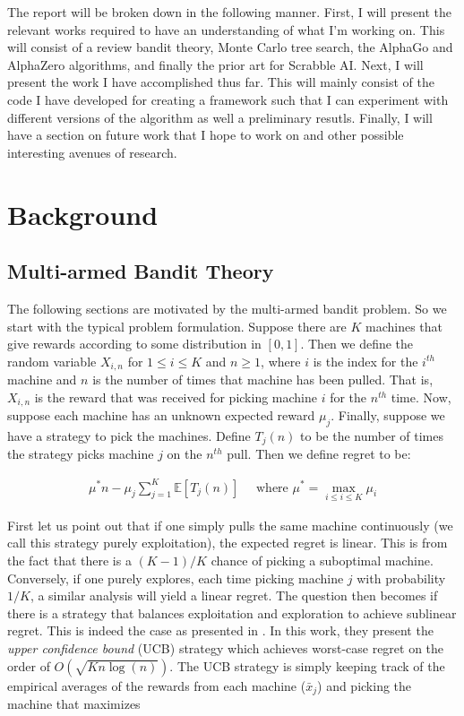 \documentclass{article}
\begin{document}
  The report will be broken down in the following manner. First, I will present the relevant works required to have an understanding of what I'm working on. This will consist of a review bandit theory, Monte Carlo tree search, the AlphaGo and AlphaZero algorithms, and finally the prior art for Scrabble AI. Next, I will present the work I have accomplished thus far. This will mainly consist of the code I have developed for creating a framework such that I can experiment with different versions of the algorithm as well a preliminary resutls. Finally, I will have a section on future work that I hope to work on and other possible interesting avenues of research.

  \clearpage

  \section{Background}

  \subsection{Multi-armed Bandit Theory}
  The following sections are motivated by the multi-armed bandit problem. So we start with the typical problem formulation. Suppose there are $K$ machines that give rewards according to some distribution in $[0,1]$. Then we define the random variable $X_{i,n}$ for $1 \leq i \leq K$ and $n \geq 1$, where $i$ is the index for the $i^{th}$ machine and $n$ is the number of times that machine has been pulled. That is, $X_{i,n}$ is the reward that was received for picking machine $i$ for the $n^{th}$ time. Now, suppose each machine has an unknown expected reward $\mu_j$. Finally, suppose we have a strategy to pick the machines. Define $T_j(n)$ to be the number of times the strategy picks machine $j$ on the $n^{th}$ pull. Then we define regret to be:

  \begin{gather*}
    \mu^*n - \mu_j \sum_{j=1}^K \mathbb{E} [T_j(n)] \quad \text{ where } \mu^* = \max_{i \leq i \leq K} \mu_i
  \end{gather*}

  First let us point out that if one simply pulls the same machine continuously (we call this strategy purely exploitation), the expected regret is linear. This is from the fact that there is a $(K-1)/K$ chance of picking a suboptimal machine. Conversely, if one purely explores, each time picking machine $j$ with probability $1/K$, a similar analysis will yield a linear regret. The question then becomes if there is a strategy that balances exploitation and exploration to achieve sublinear regret. This is indeed the case as presented in \cite{auer_finite-time_2002}. In this work, they present the \textit{upper confidence bound} (UCB) strategy which achieves worst-case regret on the order of $O(\sqrt{K n \log(n)})$. The UCB strategy is simply keeping track of the empirical averages of the rewards from each machine ($\bar{x}_j$) and picking the machine that maximizes
\end{document}
